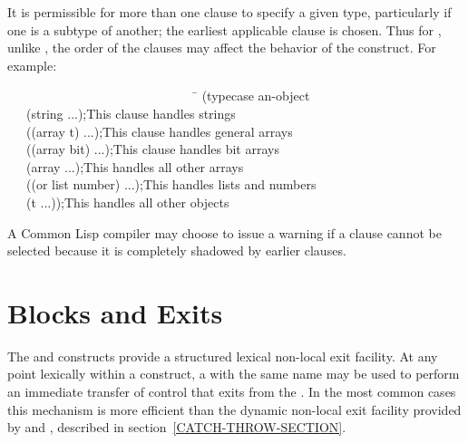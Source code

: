 \begin{defmac}
It is permissible for more than one clause to specify a given type,
particularly if one is a subtype of another; the earliest applicable
clause is chosen.  Thus for , unlike , the order
of the clauses may affect the behavior of the construct.
For example:
\begin{lisp}
~~~~~~~~~~~~~~~~~~~~~~~~~~~~~~\=\kill
(typecase an-object \\
~~~(string ...)\>;\textrm{This clause handles strings} \\
~~~((array t) ...)\>;\textrm{This clause handles general arrays} \\
~~~((array bit) ...)\>;\textrm{This clause handles bit arrays} \\
~~~(array ...)\>;\textrm{This handles all other arrays} \\
~~~((or list number) ...)\>;\textrm{This handles lists and numbers} \\
~~~(t ...))\>;\textrm{This handles all other objects}
\end{lisp}
A Common Lisp compiler may choose to issue a warning if
a clause cannot be selected because it is completely shadowed by
earlier clauses.
\end{defmac}

\section{Blocks and Exits}
\label{BLOCK-RETURN-SECTION}

The  and  constructs provide a structured lexical
non-local exit facility.  At any point lexically within a 
construct, a  with the same name may be used to
perform an immediate transfer of control that
exits from the .  In the most common cases this mechanism is
more efficient than the dynamic non-local exit facility
provided by  and , described in
section~\ref{CATCH-THROW-SECTION}.

